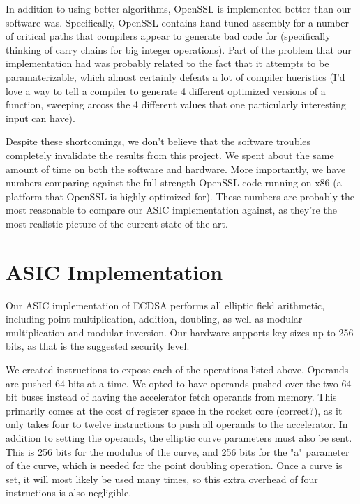 \documentclass[twocolumn]{article}
\begin{document}
In addition to using better algorithms, OpenSSL is implemented better
than our software was.  Specifically, OpenSSL contains hand-tuned
assembly for a number of critical paths that compilers appear to
generate bad code for (specifically thinking of carry chains for
big integer operations).  Part of the problem that our implementation
had was probably related to the fact that it attempts to be
paramaterizable, which almost certainly defeats a lot of compiler
hueristics (I'd love a way to tell a compiler to generate 4 different
optimized versions of a function, sweeping arcoss the 4 different
values that one particularly interesting input can have).

Despite these shortcomings, we don't believe that the software troubles
completely invalidate the results from this project.  We spent about
the same amount of time on both the software and hardware. 
More importantly, we have numbers comparing
against the full-strength OpenSSL code running on x86 (a platform that
OpenSSL is highly optimized for\cite{kasper-openssl_ecc}).  These
numbers are probably the most reasonable to compare our ASIC
implementation against, as they're the most realistic picture of the
current state of the art.

\section{ASIC Implementation}

Our ASIC implementation of ECDSA performs all elliptic field arithmetic,
including point multiplication, addition, doubling, as well as modular
multiplication and modular inversion. Our hardware supports key sizes
up to 256 bits, as that is the suggested security level.

We created instructions to expose each of the operations listed above. Operands
are pushed 64-bits at a time. We opted to have operands pushed over the two 64-bit
buses instead of having the accelerator fetch operands from memory. This primarily 
comes at the cost of register space in the rocket core (correct?), as it only takes 
four to twelve instructions to push all operands to the accelerator. In addition to 
setting the operands, the elliptic curve parameters must also be sent. This is 256 bits
for the modulus of the curve, and 256 bits for the "a" parameter of the curve, which
is needed for the point doubling operation. Once a curve is set, it will most likely
be used many times, so this extra overhead of four instructions is also 
negligible. 
\end{document}
